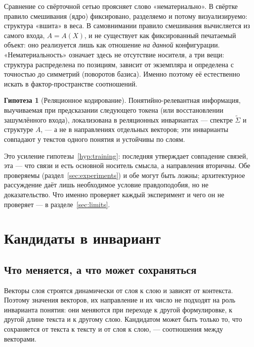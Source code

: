 \documentclass[11pt,a4paper]{article}
\theoremstyle{definition}
\newtheorem{hypothesis}[definition]{Гипотеза}
\theoremstyle{plain}
\begin{document}
Сравнение со свёрточной сетью проясняет слово «нематериально». В свёртке правило смешивания
(ядро) фиксировано, разделяемо и потому визуализируемо: структура «вшита» в веса. В
самовнимании правило смешивания вычисляется из самого входа, $A=A(X)$, и не существует как
фиксированный печатаемый объект: оно реализуется лишь как отношение \emph{на данной}
конфигурации. «Нематериальность» означает здесь не отсутствие носителя, а три вещи: структура
распределена по позициям, зависит от экземпляра и определена с точностью до симметрий
(поворотов базиса). Именно поэтому её естественно искать в фактор-пространстве соотношений.

\begin{hypothesis}[Реляционное кодирование]\label{hyp:relational}
Понятийно-релевантная информация, выучиваемая при предсказании следующего токена (или
восстановлении зашумлённого входа), локализована в реляционных инвариантах — спектре
$\tilde\Sigma$ и структуре $A$, — а не в направлениях отдельных векторов; эти инварианты
совпадают у текстов одного понятия и устойчивы по слоям.
\end{hypothesis}

Это усиление гипотезы~\ref{hyp:training}: последняя утверждает совпадение связей, эта — что
связи и есть основной носитель смысла, а направления вторичны. Обе проверяемы
(раздел~\ref{sec:experiments}) и обе могут быть ложны; архитектурное рассуждение даёт лишь
необходимое условие правдоподобия, но не доказательство. Что именно проверяет каждый
эксперимент и чего он не проверяет — в разделе~\ref{sec:limits}.

\section{Кандидаты в инвариант}\label{sec:invariants}

\subsection{Что меняется, а что может сохраняться}

Векторы слоя строятся динамически от слоя к слою и зависят от контекста. Поэтому значения
векторов, их направление и их число не подходят на роль инварианта понятия: они меняются при
переходе к другой формулировке, к другой длине текста и к другому слою. Кандидатом может быть
только то, что сохраняется от текста к тексту и от слоя к слою, — соотношения между векторами.
\end{document}
